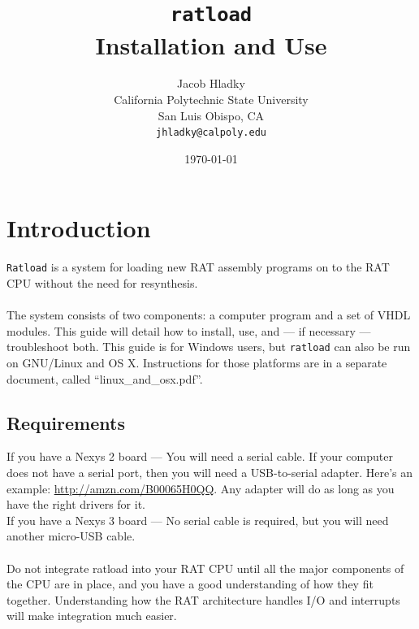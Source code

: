 \documentclass[notitlepage]{article}
\makeatletter
\newcommand*{\toccontents}{\@starttoc{toc}}
\makeatother
\begin{document}
\title{\huge{\texttt{ratload}\\ Installation and Use}}
\author{
  Jacob Hladky\\
  California Polytechnic State University\\
  San Luis Obispo, CA\\
  \texttt{jhladky@calpoly.edu}
}
\date{\today}
\maketitle

\toccontents


\section{Introduction}
\texttt{Ratload} is a system for loading new RAT assembly programs on to the RAT CPU without the need for resynthesis.\\\\
The system consists of two components: a computer program and a set of VHDL modules. This guide will detail how to install, use, and --- if necessary --- troubleshoot both. This guide is for Windows users, but \texttt{ratload} can also be run on GNU/Linux and OS X. Instructions for those platforms are in a separate document, called ``linux\_and\_osx.pdf''.

\subsection{Requirements}
If you have a Nexys 2 board --- You will need a serial cable. If your computer does not have a serial port, then you will need a USB-to-serial adapter. Here's an example: \url{http://amzn.com/B00065H0QQ}. Any adapter will do as long as you have the right drivers for it.\\
If you have a Nexys 3 board --- No serial cable is required, but you will need another micro-USB cable.\\\\
Do not integrate ratload into your RAT CPU until all the major components of the CPU are in place, and you have a good understanding of how they fit together. Understanding how the RAT architecture handles I/O and interrupts will make integration much easier.
\end{document}
